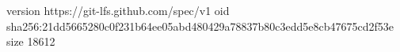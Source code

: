 version https://git-lfs.github.com/spec/v1
oid sha256:21dd5665280c0f231b64ee05abd480429a78837b80c3edd5e8cb47675cd2f53e
size 18612
